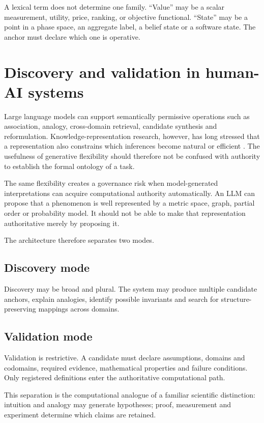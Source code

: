 \documentclass[11pt,a4paper]{article}
\begin{document}
A lexical term does not determine one family. ``Value'' may be a scalar measurement, utility, price, ranking, or objective functional. ``State'' may be a point in a phase space, an aggregate label, a belief state or a software state. The anchor must declare which one is operative.

\section{Discovery and validation in human-AI systems}
Large language models can support semantically permissive operations such as association, analogy, cross-domain retrieval, candidate synthesis and reformulation. Knowledge-representation research, however, has long stressed that a representation also constrains which inferences become natural or efficient \cite{davis1993}. The usefulness of generative flexibility should therefore not be confused with authority to establish the formal ontology of a task.

The same flexibility creates a governance risk when model-generated interpretations can acquire computational authority automatically. An LLM can propose that a phenomenon is well represented by a metric space, graph, partial order or probability model. It should not be able to make that representation authoritative merely by proposing it.

The architecture therefore separates two modes.

\subsection{Discovery mode}
Discovery may be broad and plural. The system may produce multiple candidate anchors, explain analogies, identify possible invariants and search for structure-preserving mappings across domains.

\subsection{Validation mode}
Validation is restrictive. A candidate must declare assumptions, domains and codomains, required evidence, mathematical properties and failure conditions. Only registered definitions enter the authoritative computational path.

This separation is the computational analogue of a familiar scientific distinction: intuition and analogy may generate hypotheses; proof, measurement and experiment determine which claims are retained.
\end{document}
